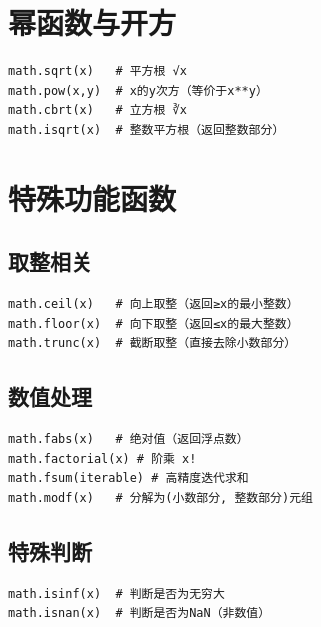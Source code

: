 \section{幂函数与开方}
\begin{lstlisting}[style=demostyle,numbers=none]
math.sqrt(x)   # 平方根 √x
math.pow(x,y)  # x的y次方（等价于x**y）
math.cbrt(x)   # 立方根 ∛x
math.isqrt(x)  # 整数平方根（返回整数部分）
\end{lstlisting}

\section{特殊功能函数}
\subsection{取整相关}
\begin{lstlisting}[style=demostyle,numbers=none]
math.ceil(x)   # 向上取整（返回≥x的最小整数）
math.floor(x)  # 向下取整（返回≤x的最大整数）
math.trunc(x)  # 截断取整（直接去除小数部分）
\end{lstlisting}

\subsection{数值处理}
\begin{lstlisting}[style=demostyle,numbers=none]
math.fabs(x)   # 绝对值（返回浮点数）
math.factorial(x) # 阶乘 x!
math.fsum(iterable) # 高精度迭代求和
math.modf(x)   # 分解为(小数部分, 整数部分)元组
\end{lstlisting}

\subsection{特殊判断}
\begin{lstlisting}[style=demostyle,numbers=none]
math.isinf(x)  # 判断是否为无穷大
math.isnan(x)  # 判断是否为NaN（非数值）
\end{lstlisting}

